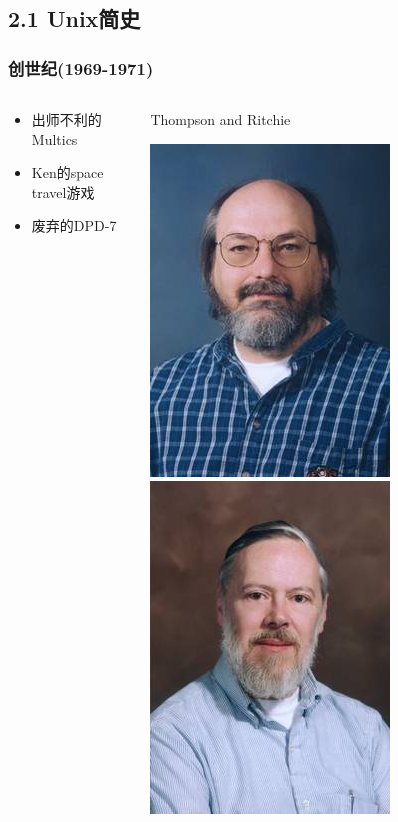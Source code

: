 \documentclass[xcolor=svgnames,presentation]{beamer}
\begin{document}
\subsection{2.1 Unix简史}
\label{sec-2-1}
\begin{frame}
\frametitle{创世纪(1969-1971)}
\label{sec-2-1-1}
\begin{columns}
\begin{column}{0.5\textwidth}
\label{sec-2-1-1-1}
\begin{itemize}

\item 出师不利的Multics
\label{sec-2-1-1-2}%

\item Ken的space travel游戏
\label{sec-2-1-1-3}%

\item 废弃的DPD-7
\label{sec-2-1-1-4}%
\end{itemize} %
\end{column}
\begin{column}{0.5\textwidth}
\begin{exampleblock}{Thompson and Ritchie}
\label{sec-2-1-1-5}

\includegraphics[width=.5\textwidth]{img/thompson02.jpg}
\includegraphics[width=.5\textwidth]{img/ritchie02.jpg}
\end{exampleblock}
\end{column}
\end{columns}
\end{frame}
\end{document}
